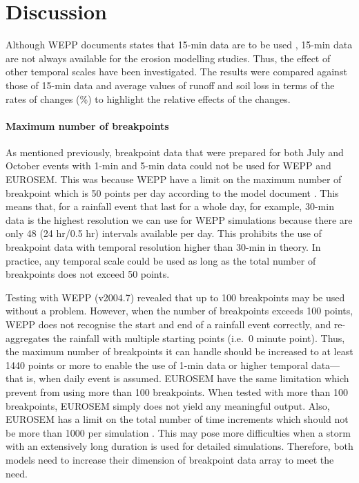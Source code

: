 \section{Discussion}
\label{sec:TemporalScalesDiscussion}

Although WEPP documents states that 15-min data are to be used
\citep{flanagan1995-weppusersummary}, 15-min data are not always available for
the erosion modelling studies. Thus, the effect of other temporal scales have
been investigated. The results were compared against those of 15-min data and
average values of runoff and soil loss in terms of the rates of changes (\%) to
highlight the relative effects of the changes.

\paragraph{Maximum number of breakpoints} As mentioned previously, breakpoint
data that were prepared for both July and October events with 1-min and 5-min
data could not be used for WEPP and EUROSEM. This was because WEPP have a limit
on the maximum number of breakpoint which is 50 points per day according to the
model document \citep[see][page 10]{flanagan1995-weppusersummary}. This means
that, for a rainfall event that last for a whole day, for example, 30-min data
is the highest resolution we can use for WEPP simulations because there are only
48 (24 hr/0.5 hr) intervals available per day. This prohibits the use of
breakpoint data with temporal resolution higher than 30-min in theory. In
practice, any temporal scale could be used as long as the total number of
breakpoints does not exceed 50 points.

Testing with WEPP (v2004.7) revealed that up to 100 breakpoints may be used
without a problem. However, when the number of breakpoints exceeds 100
points, WEPP does not recognise the start and end of a rainfall event correctly,
and re-aggregates the rainfall with multiple starting points (i.e.\ 0 minute
point). Thus, the maximum number of breakpoints it can handle should be
increased to at least 1440 points or more to enable the use of 1-min data or
higher temporal data---that is, when daily event is assumed. EUROSEM have the
same limitation which prevent from using more than 100 breakpoints. When tested
with more than 100 breakpoints, EUROSEM simply does not yield any meaningful
output. Also, EUROSEM has a limit on the total number of time increments which
should not be more than 1000 per simulation
\citep{morgan1998-europeansoilerosion}. This may pose more difficulties when a
storm with an extensively long duration is used for detailed simulations.
Therefore, both models need to increase their dimension of breakpoint data array
to meet the need.

